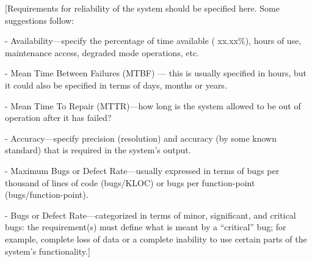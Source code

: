 [Requirements for reliability of the system should
 be specified here. Some suggestions follow:

- Availability—specify the percentage of time 
  available ( xx.xx\%), hours of use, maintenance 
  access, degraded mode operations, etc.

- Mean Time Between Failures (MTBF) — this is 
  usually specified in hours, but it could also 
  be specified in terms of days, months or years.

- Mean Time To Repair (MTTR)—how long is the 
  system allowed to be out of operation after it 
  has failed?

- Accuracy—specify precision (resolution) and 
  accuracy (by some known standard) that is required
  in the system’s output.

- Maximum Bugs or Defect Rate—usually expressed 
  in terms of bugs per thousand of lines of code 
  (bugs/KLOC) or bugs per function-point
  (bugs/function-point).
  
- Bugs or Defect Rate—categorized in terms of 
  minor, significant, and critical bugs: the 
  requirement(s) must define what is meant by 
  a “critical” bug; for example, complete loss 
  of data or a complete inability to use certain 
  parts of the system’s functionality.]
